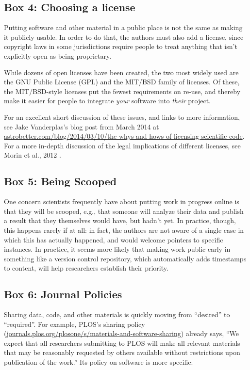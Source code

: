 \documentclass[10pt]{article}
\begin{document}
\subsection{Box 4: Choosing a license}

Putting software and other material in a public place is not the same
as making it publicly usable.  In order to do that, the authors must
also add a license, since copyright laws in some jurisdictions require
people to treat anything that isn't explicitly open as being
proprietary.

While dozens of open licenses have been created, the two most widely
used are the GNU Public License (GPL) and the MIT/BSD family of
licenses.  Of these, the MIT/BSD-style licenses put the fewest
requirements on re-use, and thereby make it easier for people to
integrate \emph{your} software into \emph{their} project.

For an excellent short discussion of these issues, and links to more
information, see Jake Vanderplas's blog post from March 2014 at
\href{http://www.astrobetter.com/blog/2014/03/10/the-whys-and-hows-of-licensing-scientific-code/}{astrobetter.com/blog/2014/03/10/the-whys-and-hows-of-licensing-scientific-code}.
For a more in-depth discussion of the legal implications of different licenses, see Morin et al., 2012 \cite{22844236}.


\subsection{Box 5: Being Scooped}

One concern scientists frequently have about putting work in progress online is that they will be scooped, e.g., that someone will analyze their data and publish a result that they themselves would have, but hadn't yet.  In practice, though, this happens rarely if at all: in fact, the authors are not aware of a single case in which this has actually happened, and would welcome pointers to specific instances.  In practice, it seems more likely that making work public early in something like a version control repository, which automatically adds timestamps to content, will help researchers establish their priority.


\subsection{Box 6: Journal Policies}

Sharing data, code, and other materials is quickly moving from ``desired'' to ``required''.
For example, PLOS's sharing policy (\href{http://journals.plos.org/plosone/s/materials-and-software-sharing}{journals.plos.org/plosone/s/materials-and-software-sharing})
already says, ``We expect that all researchers submitting to PLOS will make all relevant materials that may be reasonably requested by others available without restrictions upon publication of the work.''
Its policy on software is more specific:
\end{document}
